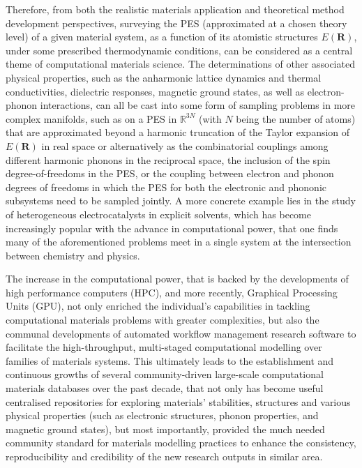 Therefore, from both the realistic materials application and theoretical method development perspectives, surveying the PES (approximated at a chosen theory level) of a given material system, as a function of its atomistic structures $E(\bm{R})$, under some prescribed thermodynamic conditions, can be considered as a central theme of computational materials science. The determinations of other associated physical properties, such as the anharmonic lattice dynamics and thermal conductivities,\cite{knoop2024tdep,tadano2015self,phono3py} dielectric responses,\cite{souza2002first} magnetic ground states,\cite{fender2025altermagnetism} as well as electron-phonon interactions,\cite{giustino2017electron} can all be cast into some form of sampling problems in more complex manifolds, such as on a PES in $\mathbb{R}^{3N}$ (with $N$ being the number of atoms) that are approximated beyond a harmonic truncation of the Taylor expansion of $E(\bm{R})$ in real space or alternatively as the combinatorial couplings among different harmonic phonons in the reciprocal space, the inclusion of the spin degree-of-freedoms in the PES, or the coupling between electron and phonon degrees of freedoms in which the PES for both the electronic and phononic subsystems need to be sampled jointly. A more concrete example lies in the study of heterogeneous electrocatalysts in explicit solvents,\cite{Andrade2020ProtonTransfer,Qin2023CO2Electroreduction,Sakong2018ElectricDoubleLayer} which has become increasingly popular with the advance in computational power, that one finds many of the aforementioned problems meet in a single system at the intersection between chemistry and physics.

The increase in the computational power, that is backed by the developments of high performance computers (HPC), and more recently, Graphical Processing Units (GPU), not only enriched the individual's capabilities in tackling computational materials problems with greater complexities, but also the communal developments of automated workflow management research software\cite{ganose2025atomate2,ong2013python} to facilitate the high-throughput, multi-staged computational modelling over families of materials systems. This ultimately leads to the establishment and continuous growths of several community-driven large-scale computational materials databases\cite{jain_apl_mater,draxl2019nomad,kirklin2015open,tran2023open} over the past decade, that not only has become useful centralised repositories for exploring materials' stabilities, structures and various physical properties (such as electronic structures, phonon properties, and magnetic ground states), but most importantly, provided the much needed community standard for materials modelling practices to enhance the consistency, reproducibility and credibility of the new research outputs in similar area.

